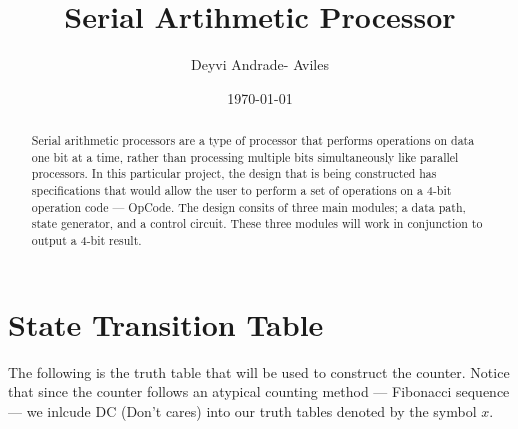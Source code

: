 \documentclass[11pt,a4paper,english]{article}
\author{Deyvi Andrade- Aviles}
\date{\today}
\begin{document}
\providecommand{\ShortAuthorList}[0]{A.~M.~Surname, B.~D.~Suffix Jr., C.~G. Suffix III} %
\title{Serial Artihmetic Processor}

\date{}
\begin{abstract}
\noindent
Serial arithmetic processors are a type of processor that performs operations on data one bit at a time, rather than processing multiple bits simultaneously like parallel processors. In this particular project, the design that is being constructed has specifications that would allow the user to perform a set of operations on a 4-bit operation code --- OpCode. The design consits of three main modules; a data path, state generator, and a control circuit. These three modules will work in conjunction to output a 4-bit result.


\DOI{} %
\end{abstract}

\maketitle
\thispagestyle{titlestyle}

\pagebreak

\section{State Transition Table}
 The following is the truth table that will be used to construct the counter. Notice that since the counter follows an atypical counting method --- Fibonacci sequence --- we inlcude DC (Don't cares) into our truth tables denoted by the symbol $x$.
\end{document}

